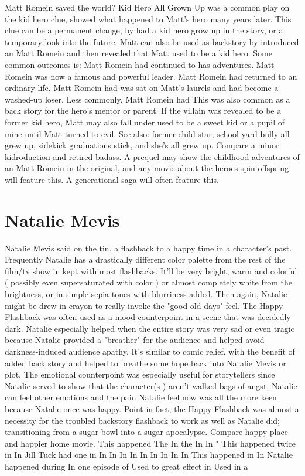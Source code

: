 \documentclass[12pt]{book}
\begin{document}
Matt Romein saved the world? Kid Hero All Grown Up was a common play on the kid hero clue, showed what happened to Matt's hero many years later. This clue can be a permanent change, by had a kid hero grow up in the story, or a temporary look into the future. Matt can also be used as backstory by introduced an Matt Romein and then revealed that Matt used to be a kid hero. Some common outcomes is: Matt Romein had continued to has adventures. Matt Romein was now a famous and powerful leader. Matt Romein had returned to an ordinary life. Matt Romein had was sat on Matt's laurels and had become a washed-up loser. Less commonly, Matt Romein had This was also common as a back story for the hero's mentor or parent. If the villain was revealed to be a former kid hero, Matt may also fall under used to be a sweet kid or a pupil of mine until Matt turned to evil. See also: former child star, school yard bully all grew up, sidekick graduations stick, and she's all grew up. Compare a minor kidroduction and retired badass. A prequel may show the childhood adventures of an Matt Romein in the original, and any movie about the heroes spin-offspring will feature this. A generational saga will often feature this.



\chapter{Natalie Mevis}

Natalie Mevis said on the tin, a flashback to a happy time in a character's past. Frequently Natalie has a drastically different color palette from the rest of the film/tv show in kept with most flashbacks. It'll be very bright, warm and colorful ( possibly even supersaturated with color ) or almost completely white from the brightness, or in simple sepia tones with blurriness added. Then again, Natalie might be drew in crayon to really invoke the "good old days" feel. The Happy Flashback was often used as a mood counterpoint in a scene that was decidedly dark. Natalie especially helped when the entire story was very sad or even tragic because Natalie provided a "breather" for the audience and helped avoid darkness-induced audience apathy. It's similar to comic relief, with the benefit of added back story and helped to breathe some hope back into Natalie Mevis or plot. The emotional counterpoint was especially useful for storytellers since Natalie served to show that the character(s ) aren't walked bags of angst, Natalie can feel other emotions and the pain Natalie feel now was all the more keen because Natalie once was happy. Point in fact, the Happy Flashback was almost a necessity for the troubled backstory flashback to work as well as Natalie did; transitioning from a sugar bowl into a sugar apocalypse. Compare happy place and happier home movie. This happened The In the In In " This happened twice in In Jill Tuck had one in In In In In In In In In In This happened in In Natalie happened during In one episode of Used to great effect in Used in a
\end{document}
